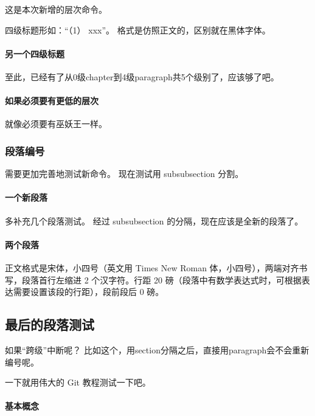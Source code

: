 \documentclass[../Main/thesis]{subfiles}
\begin{document}
这是本次新增的层次命令。

四级标题形如：“（1） xxx”。
格式是仿照正文的，区别就在黑体字体。

\paragraph{另一个四级标题} \label{spr:subpar}

至此，已经有了从0级chapter到4级paragraph共5个级别了，应该够了吧。

\paragraph{如果必须要有更低的层次}

就像必须要有巫妖王一样。

\subsubsection{段落编号}

需要更加完善地测试新命令。
现在测试用 subsubsection 分割。

\paragraph{一个新段落}

多补充几个段落测试。
经过 subsubsection 的分隔，现在应该是全新的段落了。

\paragraph{两个段落} \label{par:second}

正文格式是宋体，小四号（英文用 Times New Roman 体，小四号），两端对齐书写，段落首行左缩进 2 个汉字符。行距 20 磅（段落中有数学表达式时，可根据表达需要设置该段的行距），段前段后 0 磅。

\subsection{最后的段落测试} \label{sec:lastpar}

如果“跨级”中断呢？
比如这个，用section分隔之后，直接用paragraph会不会重新编号呢。

一下就用伟大的 Git 教程测试一下吧。

\paragraph{基本概念} \label{par:git-concept}
\end{document}
